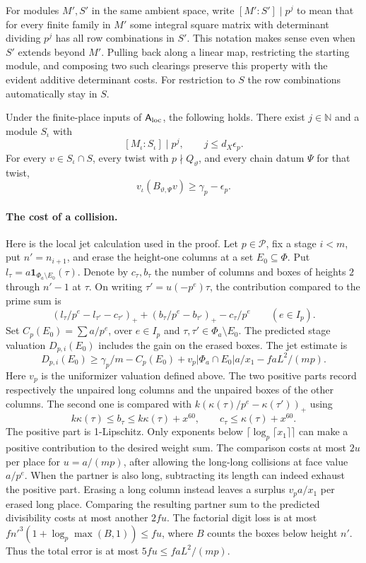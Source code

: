 For modules $M',S'$ in the same ambient space, write $[M':S']\mid p^j$ to mean that for every finite family in $M'$ some integral square matrix with determinant dividing $p^j$ has all row combinations in $S'$. This notation makes sense even when $S'$ extends beyond $M'$. Pulling back along a linear map, restricting the starting module, and composing two such clearings preserve this property with the evident additive determinant costs. For restriction to $S$ the row combinations automatically stay in $S$.

\begin{chatAlemma}\label{A:clear}
Under the finite-place inputs of $\mathsf A_{\rm loc}$, the following holds.
There exist $j\in\mathbb N$ and a module $S_\iota$ with
\[
 [M_\iota:S_\iota]\mid p^j,\qquad j\le d_X \epsilon_p.
\]
For every $v\in S_\iota\cap S$, every twist with $p\nmid Q_\vartheta$, and every chain datum $\Psi$ for that twist,
\[
 v_\iota(B_{\vartheta,\Psi}v)\ge\gamma_p-\epsilon_p.
\]
\end{chatAlemma}

\paragraph{The cost of a collision.}\label{A:jets}
Here is the local jet calculation used in the proof. Let $p\in\mathcal P$, fix a stage $i<m$, put $n'=n_{i+1}$, and erase the height-one columns at a set $E_0\subseteq\Phi$. Put $l_\tau=a\mathbf1_{\Phi_a\setminus E_0}(\tau)$. Denote by $c_\tau,b_\tau$ the number of columns and boxes of heights $2$ through $n'-1$ at $\tau$. On writing $\tau'=u(-p^e)\tau$, the contribution compared to the prime sum is
\[
 (l_\tau/p^e-l_{\tau'}-c_{\tau'})_+
 +(b_\tau/p^e-b_{\tau'})_+ -c_\tau/p^e
 \qquad(e\in I_p).
\]
Set $C_p(E_0)=\sum a/p^e$, over $e\in I_p$ and $\tau,\tau'\in\Phi_a\setminus E_0$. The predicted stage valuation $D_{p,i}(E_0)$ includes the gain on the erased boxes. The jet estimate is
\begin{equation}
 D_{p,i}(E_0)\ge \gamma_p/m-C_p(E_0)
 +v_p|\Phi_a\cap E_0|a/x_1-faL^2/(mp).\label{A:collision}
\end{equation}
Here $v_p$ is the uniformizer valuation defined above. The two positive parts record respectively the unpaired long columns and the unpaired boxes of the other columns. The second one is compared with $k(\kappa(\tau)/p^e-\kappa(\tau'))_+$ using
\[
 k\kappa(\tau)\le b_\tau\le k\kappa(\tau)+x^{60},\qquad
 c_\tau\le\kappa(\tau)+x^{60}.
\]
The positive part is 1-Lipschitz. Only exponents below $\lceil\log_p\lceil x_1\rceil\rceil$ can make a positive contribution to the desired weight sum. The comparison costs at most $2u$ per place for $u=a/(mp)$, after allowing the long-long collisions at face value $a/p^e$. When the partner is also long, subtracting its length can indeed exhaust the positive part. Erasing a long column instead leaves a surplus $v_p a/x_1$ per erased long place. Comparing the resulting partner sum to the predicted divisibility costs at most another $2fu$. The factorial digit loss is at most $fn'^3(1+\log_p\max(B,1))\le fu$, where $B$ counts the boxes below height $n'$. Thus the total error is at most $5fu\le faL^2/(mp)$.

